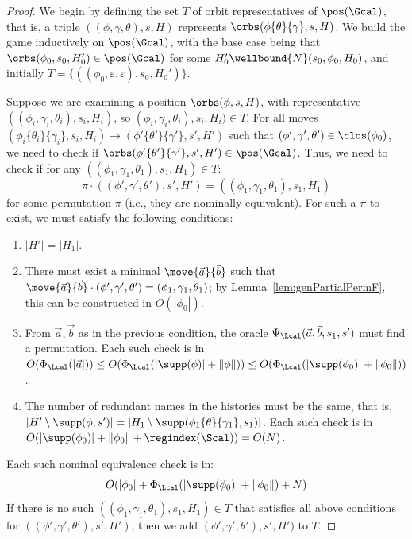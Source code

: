 \begin{proof}
	We begin by defining the set $T$ of orbit representatives of $\pos(\Gcal)$, that is, a triple $((\phi, \gamma, \theta), s, H)$ represents $\orbs(\phi\{\theta\}\{\gamma\}, s, H)$.
	We build the game inductively on $\pos(\Gcal)$, with the base case being that $\orbs(\phi_0, s_0, H_0') \in \pos(\Gcal)$ for some $H_0'\wellbound{N}(s_0,\phi_0,H_0)$, and initially $T = \{((\phi_0, \varepsilon, \varepsilon), s_0, H_0')\}$.
	
	Suppose we are examining a position $\orbs( \phi,  s,  H)$, 
	with representative $((\phi_i, \gamma_i, \theta_i), s_i, H_i)$, so $(\phi_i, \gamma_i, \theta_i), s_i, H_i) \in T$. 
	For all moves $(\phi_i\{\theta_i\}\{\gamma_i\}, s_i, H_i) \to (\phi'\{\theta'\}\{\gamma'\}, s', H')$ such that $(\phi', \gamma', \theta') \in \clos(\phi_0)$, we need to check if $\orbs(\phi'\{\theta'\}\{\gamma'\}, s', H') \in \pos(\Gcal)$. 
	Thus, we need to check if for any $((\phi_1, \gamma_1, \theta_1), s_1, H_1) \in T$:
	$$\pi \cdot ((\phi', \gamma', \theta'), s', H') = ((\phi_1, \gamma_1, \theta_1), s_1, H_1)$$ 
	for some permutation $\pi$ (i.e., they are nominally equivalent).
	For such a $\pi$ to exist, we must satisfy the following conditions:
	\begin{enumerate}
		\item $|H'| = |H_1|$.
				\item There must exist a minimal $\move{\vec a}{\vec b}$ such that $\move{\vec a}{\vec b} \cdot (\phi', \gamma', \theta') = (\phi_1, \gamma_1, \theta_1)$; 
	 	by Lemma~\ref{lem:genPartialPermF}, this can be constructed in $O(|\phi_0|)$.
				\item From $\vec a, \vec b$ as in the previous condition, the oracle $\Psi_\Lcal(\vec a, \vec b, s_1, s')$ must find a permutation.
		Each such check is in $O(\Phi_\Lcal(|\vec a|)) \le O(\Phi_\Lcal(|\supp(\phi)| + \|\phi\|)) \le O(\Phi_\Lcal(|\supp(\phi_0)| + \|\phi_0\|))$. 
				\item The number of redundant names in the histories must be the same, that is, $|H' \setminus \supp(\phi, s')| = |H_1 \setminus \supp(\phi_1\{\theta\}\{\gamma_1\}, s_1)|$. 
		Each such check is in $O(|\supp(\phi_0)| + \|\phi_0\| + \regindex(\Scal)) = O(N)$.
	\end{enumerate}
	Each such nominal equivalence check is in:
	\[
	O(
	|\phi_0| + \Phi_\Lcal(|\supp(\phi_0)| + \|\phi_0\|) + N
	)
	\]
	If there is no such $((\phi_1, \gamma_1, \theta_1), s_1, H_1) \in T$ that satisfies all above conditions for $((\phi', \gamma', \theta'), s', H')$, then we add $(\phi', \gamma', \theta'), s', H')$ to $T$.
		

\end{proof}
